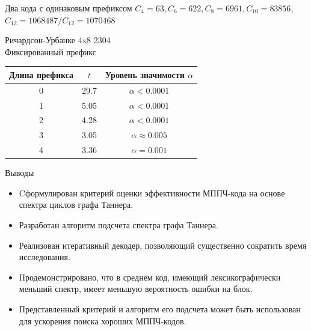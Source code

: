 \documentclass[t,13pt,graphics=pdflatex,xcolor=table,aspectratio=43]{beamer}
\begin{document}
\begin{frame}{Два кода с одинаковым префиксом}
$C_4=63, C_6=622, C_8=6961, C_{10}=83856$, $C_{12}=1068487$/$C_{12}=1070468$

\begin{figure}[h!]
\centering
\begin{subfigure}{.5\textwidth}
  \centering
\end{subfigure}%
\begin{subfigure}{.5\textwidth}
  \centering
\end{subfigure}
\end{figure}
\end{frame}

\begin{frame}{Ричардсон-Урбанке 4x8 2304 \\ Фиксированный префикс}
\begin{center}
\begin{tabular}{|c|c|c|}
	\hline
	Длина префикса & $t$ & Уровень значимости $\alpha$\\
	\hline
	0 & 29.7 &  $\alpha < 0.0001$\\
	\hline
	1 & 5.05 &  $\alpha < 0.0001$\\
	\hline
	2 & 4.28 & $\alpha < 0.0001$ \\
	\hline
	3 & 3.05 & $\alpha \approx 0.005$ \\
	\hline
	4 & 3.36 & $\alpha = 0.001$ \\
	\hline
\end{tabular}
\end{center}
\end{frame}

\begin{frame}{Выводы}
  \begin{itemize}
     \item Cформулирован критерий оценки эффективности МППЧ-кода на основе спектра циклов графа Таннера.
	\item Разработан алгоритм подсчета спектра графа Таннера.
	\item  Реализован итеративный декодер, позволяющий существенно сократить время исследования.
	\item Продемонстрировано, что в среднем код, имеющий лексикографически меньший спектр, имеет меньшую вероятность ошибки на блок.
	\item Представленный критерий и алгоритм его подсчета может быть использован для ускорения поиска хороших МППЧ-кодов.
  \end{itemize}
\end{frame}
\end{document}
